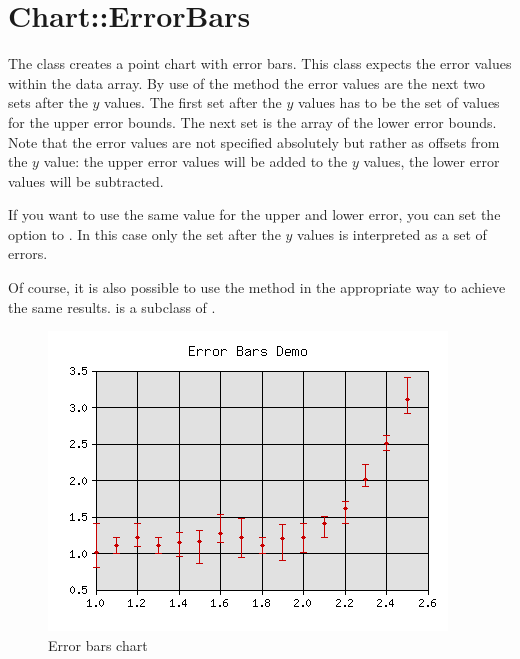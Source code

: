 %
%
\renewcommand{\thisname}{Chart::ErrorBars}
\section{\thisname}
\name{\thisname}

\begin{Description}
The class \thisclass creates a point chart with error bars. This
class expects the error values within the data array. By use of the
 method the error values are the next two sets
after the $y$ values. The first set after the $y$ values has to be the
set of values for the upper error bounds. The next set is the array of
the lower error bounds. Note that the error values are not specified
absolutely but rather as offsets from the $y$ value: the upper error
values will be added to the $y$ values, the lower error values will be
subtracted.

If you want to use the same value for the upper and lower error, you
can set the  option to . In this
case only the set after the $y$ values is interpreted as a set of
errors.

Of course, it is also possible to use the 
method in the appropriate way to achieve the same results.
\thisclass is a subclass of .
\end{Description}

\example
\begin{figure}[ht]
  \begin{center}
    \includegraphics[scale=0.7]{error.png}
  \end{center}
  \caption{Error bars chart}
  \label{fig:error}
\end{figure}

